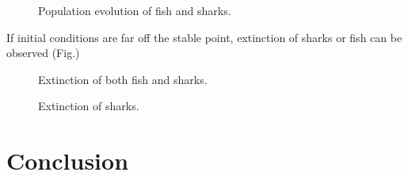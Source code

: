 \documentclass[aps,prl,preprint,superscriptaddress]{revtex4}
\begin{document}
\begin{figure}[H]
	\centering
	\caption{Population evolution of fish and sharks.}
	\label{more_clusters} 
\end{figure}

If initial conditions are far off the stable point, extinction of sharks or fish can be observed (Fig.)


\begin{figure}[H]
	\centering
	\caption{Extinction of both fish and sharks.}
	\label{more_clusters} 
\end{figure}

\begin{figure}[H]
	\centering
	\caption{Extinction of sharks.}
	\label{more_clusters} 
\end{figure}
 
 \section{Conclusion}
  
\end{document}
